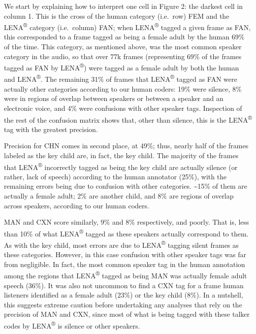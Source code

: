 \documentclass[english,table,man,floatsintext]{apa6}
\begin{document}
We start by explaining how to interpret one cell in Figure 2: the darkest cell in column 1. This is the cross of the human category (i.e.~row) FEM and the LENA\textsuperscript{®} category (i.e.~column) FAN; when LENA\textsuperscript{®} tagged a given frame as FAN, this corresponded to a frame tagged as being a female adult by the human 69\% of the time. This category, as mentioned above, was the most common speaker category in the audio, so that over 77k frames (representing 69\% of the frames tagged as FAN by LENA\textsuperscript{®}) were tagged as a female adult by both the human and LENA\textsuperscript{®}. The remaining 31\% of frames that LENA\textsuperscript{®} tagged as FAN were actually other categories according to our human coders: 19\% were silence, 8\% were in regions of overlap between speakers or between a speaker and an electronic voice, and 4\% were confusions with other speaker tags. Inspection of the rest of the confusion matrix shows that, other than silence, this is the LENA\textsuperscript{®} tag with the greatest precision.

Precision for CHN comes in second place, at 49\%; thus, nearly half of the frames labeled as the key child are, in fact, the key child. The majority of the frames that LENA\textsuperscript{®} incorrectly tagged as being the key child are actually silence (or rather, lack of speech) according to the human annotator (25\%), with the remaining errors being due to confusion with other categories. \textasciitilde{}15\% of them are actually a female adult; 2\% are another child, and 8\% are regions of overlap across speakers, according to our human coders.

MAN and CXN score similarly, 9\% and 8\% respectively, and poorly. That is, less than 10\% of what LENA\textsuperscript{®} tagged as these speakers actually correspond to them. As with the key child, most errors are due to LENA\textsuperscript{®} tagging silent frames as these categories. However, in this case confusion with other speaker tags was far from negligible. In fact, the most common speaker tag in the human annotation among the regions that LENA\textsuperscript{®} tagged as being MAN was actually female adult speech (36\%). It was also not uncommon to find a CXN tag for a frame human listeners identified as a female adult (23\%) or the key child (8\%). In a nutshell, this suggests extreme caution before undertaking any analyses that rely on the precision of MAN and CXN, since most of what is being tagged with these talker codes by LENA\textsuperscript{®} is silence or other speakers.
\end{document}
